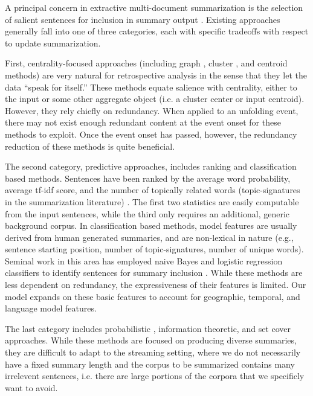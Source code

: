 \label{sec:relatedwork}

A principal concern in extractive multi-document summarization is the
selection of salient sentences for inclusion in summary output
\cite{nenkova2012survey}. 
Existing approaches generally fall into  %
one of three categories, each with specific tradeoffs with respect to update 
summarization. 

First, centrality-focused approaches (including graph \cite{erkan2004lexrank},
cluster \cite{hatzivassiloglou2001simfinder}, and centroid \cite{radev2004centroid} methods) are very natural for retrospective analysis in
the sense that they let the data ``speak for itself.'' 
These methods equate salience with centrality, either to the input or some other
aggregate object (i.e. a cluster center or input centroid).
However, they rely
chiefly on
redundancy. When applied to an unfolding event, there may not exist enough
redundant content at the event onset for these methods to exploit.
Once the event onset has passed, however, the redundancy reduction of these 
methods is quite beneficial.

The second category, predictive approaches,
includes ranking and classification based methods.
Sentences have been ranked by the average word probability, average tf-idf
score, and the number of topically related words (topic-signatures in the
summarization literature)
\cite{nenkova2005impact,hovy1998automated,lin2000automated}. The first two
statistics are easily computable from the input sentences, while the third
only requires an additional, generic background corpus.  
In classification based methods, model features are
usually derived from human generated summaries, and are non-lexical in nature
(e.g., sentence starting position, number of topic-signatures, number of
unique words). Seminal work in this area has employed naive
Bayes and logistic regression classifiers to identify sentences for summary
inclusion \cite{kupiec1995trainable,conroy2001using}. 
While these methods are less dependent on redundancy, the expressiveness of
their features is limited. Our model expands on these basic features to 
account for geographic, temporal, and language model features.

The last category includes probabilistic \cite{haghighi2009exploring}, 
information theoretic, and set cover \cite{lin2011class}
approaches. While these methods are  focused on producing diverse
summaries, they are difficult to adapt to the streaming setting, where 
we do not necessarily have a fixed summary length and the corpus to be
summarized contains many irrelevent sentences, i.e. there are large
portions of the corpora that we specificly want to avoid. 





